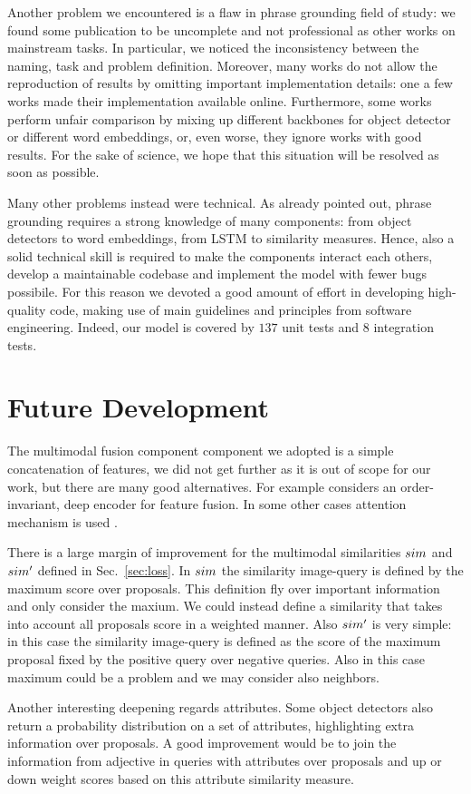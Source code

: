 Another problem we encountered is a flaw in phrase grounding field of
study: we found some publication to be uncomplete and not professional
as other works on mainstream tasks. In particular, we noticed the
inconsistency between the naming, task and problem definition.
Moreover, many works do not allow the reproduction of results by
omitting important implementation details: one a few works made their
implementation available online. Furthermore, some works perform
unfair comparison by mixing up different backbones for object detector
or different word embeddings, or, even worse, they ignore works with
good results. For the sake of science, we hope that this situation
will be resolved as soon as possible.

Many other problems instead were technical. As already pointed out,
phrase grounding requires a strong knowledge of many components: from
object detectors to word embeddings, from LSTM to similarity measures.
Hence, also a solid technical skill is required to make the components
interact each others, develop a maintainable codebase and implement
the model with fewer bugs possibile. For this reason we devoted a good
amount of effort in developing high-quality code, making use of main
guidelines and principles from software engineering. Indeed, our model
is covered by $137$ unit tests and $8$ integration tests.

\section{Future Development}

The multimodal fusion component component we adopted is a simple
concatenation of features, we did not get further as it is out of
scope for our work, but there are many good alternatives. For example
\cite{datta2019align2ground} considers an order-invariant, deep
encoder for feature fusion. In some other cases attention mechanism is
used .

There is a large margin of improvement for the multimodal similarities
$sim$ and $sim'$ defined in Sec.~\ref{sec:loss}. In $sim$
the similarity image-query is defined by the maximum score over
proposals. This definition fly over important information and only
consider the maxium. We could instead define a similarity that takes
into account all proposals score in a weighted manner. Also $sim'$
is very simple: in this case the similarity image-query is defined as
the score of the maximum proposal fixed by the positive query over
negative queries. Also in this case maximum could be a problem and we
may consider also neighbors.

Another interesting deepening regards attributes. Some object
detectors also return a probability distribution on a set of
attributes, highlighting extra information over proposals. A good
improvement would be to join the information from adjective in queries
with attributes over proposals and up or down weight scores based on
this attribute similarity measure.
